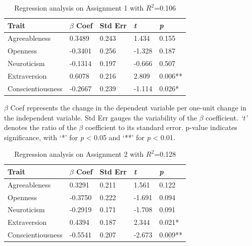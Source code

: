 \begin{table}[h]
  \centering
  \caption{Regression analysis on Assignment 1 with $R^2$=0.106\\\label{tab:assign1Regression}}
    \vspace{-16pt}
  \begin{tabular}{p{2.5cm}llll}
    \toprule
    Trait & $\beta$ Coef & Std Err & \textit{t} & \textit{p}\\\midrule
    Agreeableness & 0.3489 & 0.243 & 1.434 & 0.155 \\
    Openness & -0.3401 & 0.256 & -1.328 & 0.187 \\
    Neuroticism & -0.1314 & 0.197 & -0.666 & 0.507 \\
    Extraversion & 0.6078 & 0.216 & 2.809 & 0.006** \\
    Conscientiousness & -0.2667 & 0.239 & -1.114 & 0.026* \\\bottomrule
  \end{tabular}\vspace{-4pt}
\end{table}

$\beta$ Coef represents the change in the dependent variable per one-unit change in the independent variable. Std Err gauges the variability of the $\beta$ coefficient. \textit{`t'} denotes the ratio of the $\beta$ coefficient to its standard error. p-value indicates significance, with `*' for \emph{p} < 0.05 and `**' for \emph{p} < 0.01.

\begin{table}[h]
  \centering
  \caption{Regression analysis on Assignment 2 with $R^2$=0.128\\\label{tab:assign2Regression}}
    \vspace{-16pt}
  \begin{tabular}{p{2.5cm}llll}
    \toprule
    Trait & $\beta$ Coef & Std Err & \textit{t} & \textit{p}\\\midrule
    Agreeableness & 0.3291 & 0.211 & 1.561 & 0.122 \\
    Openness & -0.3750 & 0.222 & -1.691 & 0.094\\
    Neuroticism & -0.2919 & 0.171 & -1.708 &  0.091\\
    Extraversion & 0.4394 & 0.187 & 2.344 & 0.021*\\
    Conscientiousness & -0.5541 & 0.207 & -2.673 & 0.009**\\\bottomrule
  \end{tabular}\vspace{-4pt}
\end{table}

